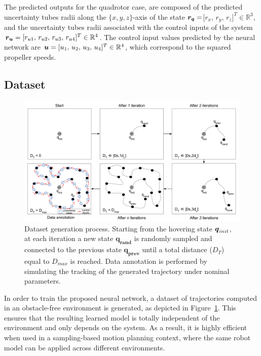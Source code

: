 The predicted outputs for the quadrotor case, are composed of the predicted uncertainty tubes radii along the $\{x,y,z\}$-axis of the state $\boldsymbol{r_q}=$[$r_{x},\,r_{y},\,r_{z}]^T \in \mathbb{R}^3$, and the uncertainty tubes radii associated with the control inputs of the system $\boldsymbol{r_u} = [r_{u1},\,r_{u2},\,r_{u3},\,r_{u4}]^T \in \mathbb{R}^4$.
The control input values predicted by the neural network are $\boldsymbol{u} = [u_1 ,\, u_2 ,\, u_3 ,\, u_4]^T \in \mathbb{R}^4$, which correspond to the squared propeller speeds.

\subsection{Dataset}\label{sec:dataset_general}

\begin{figure} [t]
    \centering
    \includegraphics[width=0.9\linewidth]{figures/learning_quadrotor/dataset_generation.png}%
    \caption{Dataset generation process. 
    Starting from the hovering state $\boldsymbol{q}_{init}$, at each iteration a new state $\boldsymbol{q_{rand}}$ is randomly sampled and connected to the previous state $\boldsymbol{q_{prev}}$ until a total distance ($D_T$) equal to $D_{max}$ is reached.
    Data annotation is performed by simulating the tracking of the generated trajectory under nominal parameters.
    }%
    \label{fig: data_generation}%
\end{figure}

In order to train the proposed neural network, a dataset of trajectories computed in an obstacle-free environment is generated, as depicted in Figure~\ref{fig: data_generation}.
This ensures that the resulting learned model is totally independent of the environment and only depends on the system.
As a result, it is highly efficient when used in a sampling-based motion planning context, where the same robot model can be applied across different environments.

